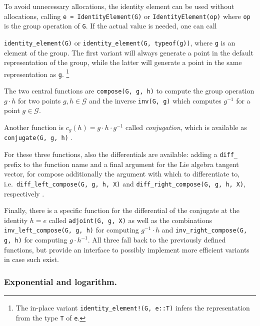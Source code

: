 \documentclass{juliacon}
\newcommand{\term}[1]{\emph{#1}}
\begin{document}
To avoid unnecessary allocations, the identity element can be used without allocations, calling \verb|e = IdentityElement(G)| or \verb|IdentityElement(op)| where \verb|op| is the group operation of \verb|G|. If the actual value is needed, one can call

\verb|identity_element(G)| or \verb|identity_element(G, typeof(g))|, where \verb|g| is an element of the group. The first variant will always generate a point in the default representation of the group, while the latter will generate a point in the same representation as \verb|g|.%
\footnote{The in-place variant \texttt{identity\_element!(G, e::T)} infers the representation from the type \texttt{T} of \texttt{e}.}

The two central functions are \verb|compose(G, g, h)|
to compute the group operation \(g \cdot h\) for two points \(g, h \in \mathcal{G}\) and the inverse \verb|inv(G, g)|
which computes \(g^{-1}\) for a point \(g \in \mathcal{G}\).

Another function is $c_g(h) = g \cdot h \cdot g^{-1}$ called \term{conjugation}, which is available as \verb|conjugate(G, g, h)|%
.

For these three functions, also the differentials are available: adding a \verb|diff_| prefix to the function name and a final argument for the Lie algebra tangent vector, for compose additionally the argument with which to  differentiate to, i.e.\ \verb|diff_left_compose(G, g, h, X)| and \verb|diff_right_compose(G, g, h, X)|, respectively%
.

Finally, there is a specific function for the differential of the conjugate at the identity $h=e$ called \verb|adjoint(G, g, X)|
as well as the combinations \verb|inv_left_compose(G, g, h)|
for computing $g^{-1}\cdot h$ and \verb|inv_right_compose(G, g, h)|
for computing $g \cdot h^{-1}$. All three fall back to the previously defined functions, but provide an interface to possibly implement more efficient variants in case such exist.

\subsubsection*{Exponential and logarithm.}
\end{document}
